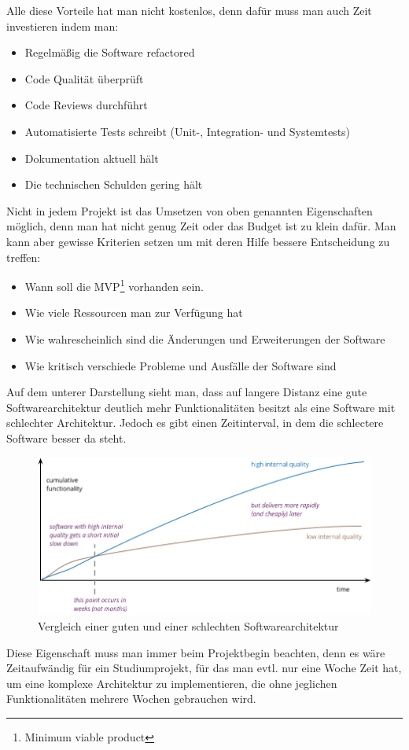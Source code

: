 \documentclass{article}
\begin{document}
    Alle diese Vorteile hat man nicht kostenlos, denn dafür muss man auch Zeit investieren indem man:
    \begin{itemize}
        \item Regelmäßig die Software refactored
        \item Code Qualität überprüft
        \item Code Reviews durchführt
        \item Automatisierte Tests schreibt (Unit-, Integration- und Systemtests)
        \item Dokumentation aktuell hält
        \item Die technischen Schulden gering hält
    \end{itemize}

    Nicht in jedem Projekt ist das Umsetzen von oben genannten Eigenschaften möglich, 
    denn man hat nicht genug Zeit oder das Budget ist zu klein dafür.
    Man kann aber gewisse Kriterien setzen um mit deren Hilfe bessere Entscheidung zu treffen:
    \begin{itemize}
        \item Wann soll die MVP\footnote[1]{Minimum viable product} vorhanden sein.
        \item Wie viele Ressourcen man zur Verfügung hat
        \item Wie wahrescheinlich sind die Änderungen und Erweiterungen der Software
        \item Wie kritisch verschiede Probleme und Ausfälle der Software sind 
    \end{itemize}

    Auf dem unterer Darstellung sieht man, dass auf langere Distanz eine gute Softwarearchitektur deutlich
    mehr Funktionalitäten besitzt als eine Software mit schlechter Architektur. 
    Jedoch es gibt einen Zeitinterval, in dem die schlectere Software besser da steht.
    \begin{figure}[H]
        \centering
        \includegraphics[width=1\textwidth]{./images/QASoftwareCompare.png}
        \caption[Vergleich einer guten und einer schlechten Softwarearchitektur]{Vergleich einer guten und einer schlechten Softwarearchitektur \footnotemark}
        \label{fig:softQuality}
    \end{figure}
    Diese Eigenschaft muss man immer beim Projektbegin beachten, denn es wäre Zeitaufwändig für ein Studiumprojekt, 
    für das man evtl. nur eine Woche Zeit hat, um eine komplexe Architektur zu implementieren, die ohne jeglichen Funktionalitäten mehrere Wochen gebrauchen wird.
\end{document}
